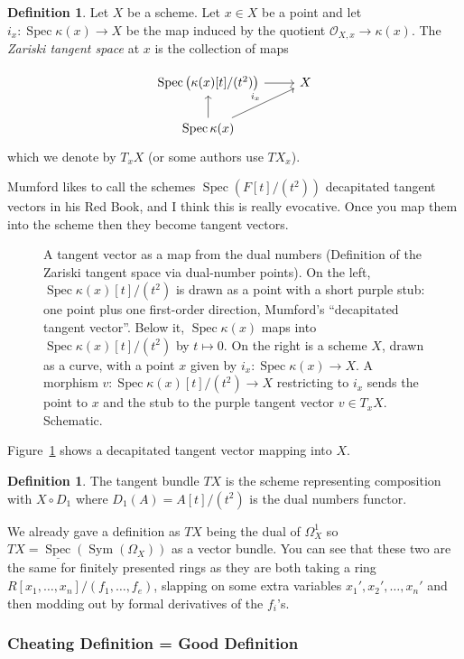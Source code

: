 \documentclass[12pt]{article}
\numberwithin{equation}{section}
\theoremstyle{definition}
\newtheorem{definition}[theorem]{Definition}
\theoremstyle{remark}
\newcommand{\Ocal}{\mathcal{O}}
\newcommand{\Spec}{\operatorname{Spec}}
\newcommand{\Sym}{\operatorname{Sym}}
\begin{document}
\begin{definition}
	Let $X$ be a scheme. 
	Let $x\in X$ be a point and let $i_x: \Spec \kappa(x) \to X$ be the map induced by the quotient $\Ocal_{X,x} \to \kappa(x)$. 
	The \emph{Zariski tangent space} at $x$ is the collection of maps 
	
	$$\begin{tikzcd}
	\Spec \left( \kappa(x)[t]/(t^2) \right )  \arrow[r] & X\\
	\Spec \kappa(x) \ar[ur,"i_x"] \arrow[u] &
	\end{tikzcd}
	$$
	which we denote by $T_xX$ (or some authors use $TX_x$).
\end{definition}
Mumford likes to call the schemes $\Spec(F[t]/(t^2))$ decapitated tangent vectors in his Red Book, and I think this is really evocative. 
Once you map them into the scheme then they become tangent vectors. 
\begin{figure}[H]
\centering

\caption{A tangent vector as a map from the dual numbers (Definition of the Zariski tangent space via dual-number points). On the left, $\Spec\kappa(x)[t]/(t^2)$ is drawn as a point with a short purple stub: one point plus one first-order direction, Mumford's ``decapitated tangent vector''. Below it, $\Spec\kappa(x)$ maps into $\Spec\kappa(x)[t]/(t^2)$ by $t\mapsto0$. On the right is a scheme $X$, drawn as a curve, with a point $x$ given by $i_x\colon\Spec\kappa(x)\to X$. A morphism $v\colon\Spec\kappa(x)[t]/(t^2)\to X$ restricting to $i_x$ sends the point to $x$ and the stub to the purple tangent vector $v\in T_xX$. Schematic.}\label{fig:decapitated-vector}
\end{figure}
Figure~\ref{fig:decapitated-vector} shows a decapitated tangent vector mapping into $X$.

\begin{definition}
	The tangent bundle $TX$ is the scheme representing composition with $X\circ D_1$ where $D_1(A) = A[t]/(t^2)$ is the dual numbers functor.
\end{definition}

We already gave a definition as $TX$ being the dual of $\Omega_{X}^1$ so $TX=\underline{\Spec}(\Sym(\Omega_X))$ as a vector bundle.
You can see that these two are the same for finitely presented rings as they are both taking a ring $R[x_1,\ldots,x_n]/(f_1,\ldots,f_e)$, slapping on some extra variables $x_1',x_2',\ldots,x_n'$ and then modding out by formal derivatives of the $f_i$'s.

\subsubsection{Cheating Definition = Good Definition}
\end{document}

